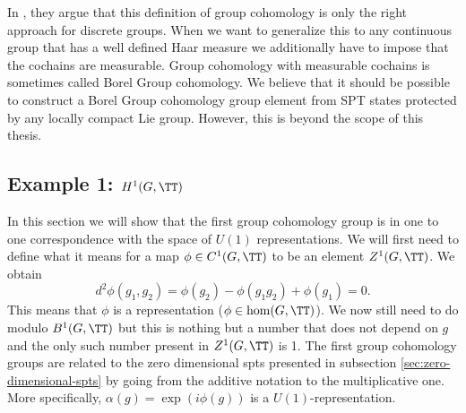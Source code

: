\begin{remark}
	In \cite{Chen_2013}, they argue that this definition of group cohomology is only the right approach for discrete groups. When we want to generalize this to any continuous group that has a well defined Haar measure we additionally have to impose that the cochains are measurable. Group cohomology with measurable cochains is sometimes called Borel Group cohomology. We believe that it should be possible to construct a Borel Group cohomology group element from SPT states protected by any locally compact Lie group. However, this is beyond the scope of this thesis.
\end{remark}
\subsection{Example 1: $H^1(G,\TT)$}\label{sec:example-1-h1gtt}
In this section we will show that the first group cohomology group is in one to one correspondence with the space of $U(1)$ representations. We will first need to define what it means for a map $\phi\in C^1(G, \TT)$ to be an element $Z^1(G,\TT)$. We obtain
\begin{equation}
	d^2\phi(g_1,g_2)=\phi(g_2)-\phi(g_1g_2)+\phi(g_1)=0.
\end{equation}
This means that $\phi$ is a representation ($\phi\in\hom(G,\TT)$). We now still need to do modulo $B^1(G,\TT)$ but this is nothing but a number that does not depend on $g$ and the only such number present in $Z^1(G,\TT)$ is 1. The first group cohomology groups are related to the zero dimensional spts presented in subsection \ref{sec:zero-dimensional-spts} by going from the additive notation to the multiplicative one. More specifically, $\alpha(g)=\exp(i\phi(g))$ is a $U(1)$-representation.
